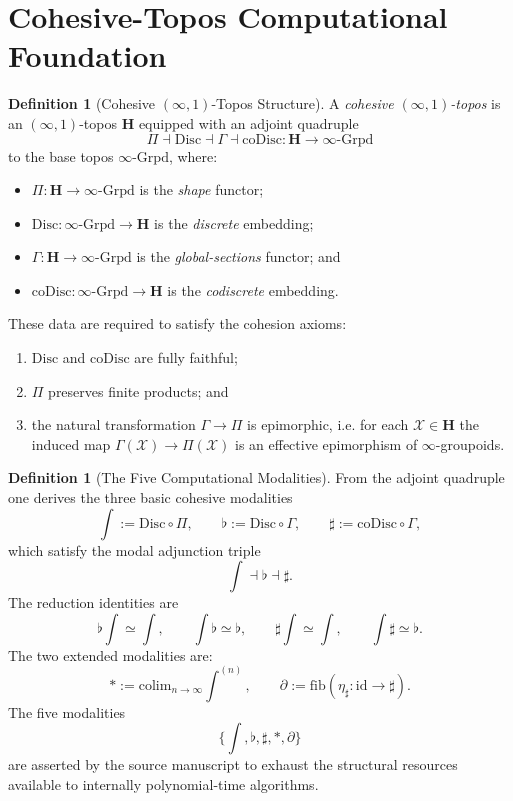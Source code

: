 \documentclass[11pt]{article}
\theoremstyle{definition}
\newtheorem{definition}[theorem]{Definition}
\theoremstyle{remark}
\newcommand{\Hc}{\mathbf{H}}
\begin{document}
\section{Cohesive-Topos Computational Foundation}

\begin{definition}[Cohesive $(\infty,1)$-Topos Structure]\label{def-cohesive-topos-computation}
A \emph{cohesive $(\infty,1)$-topos} is an $(\infty,1)$-topos $\Hc$ equipped with an adjoint quadruple
\[
\Pi \dashv \mathrm{Disc} \dashv \Gamma \dashv \mathrm{coDisc} : \Hc \to \infty\text{-Grpd}
\]
to the base topos $\infty\text{-Grpd}$, where:
\begin{itemize}
\item $\Pi : \Hc \to \infty\text{-Grpd}$ is the \emph{shape} functor;
\item $\mathrm{Disc} : \infty\text{-Grpd} \to \Hc$ is the \emph{discrete} embedding;
\item $\Gamma : \Hc \to \infty\text{-Grpd}$ is the \emph{global-sections} functor; and
\item $\mathrm{coDisc} : \infty\text{-Grpd} \to \Hc$ is the \emph{codiscrete} embedding.
\end{itemize}
These data are required to satisfy the cohesion axioms:
\begin{enumerate}
\item $\mathrm{Disc}$ and $\mathrm{coDisc}$ are fully faithful;
\item $\Pi$ preserves finite products; and
\item the natural transformation $\Gamma \to \Pi$ is epimorphic, i.e. for each $\mathcal X \in \Hc$ the induced map $\Gamma(\mathcal X) \to \Pi(\mathcal X)$ is an effective epimorphism of $\infty$-groupoids.
\end{enumerate}
\end{definition}

\begin{definition}[The Five Computational Modalities]\label{def-five-modalities}
From the adjoint quadruple one derives the three basic cohesive modalities
\[
\int := \mathrm{Disc} \circ \Pi,
\qquad
\flat := \mathrm{Disc} \circ \Gamma,
\qquad
\sharp := \mathrm{coDisc} \circ \Gamma,
\]
which satisfy the modal adjunction triple
\[
\int \dashv \flat \dashv \sharp.
\]
The reduction identities are
\[
\flat\int \simeq \int,
\qquad
\int\flat \simeq \flat,
\qquad
\sharp\int \simeq \int,
\qquad
\int\sharp \simeq \flat.
\]
The two extended modalities are:
\[
\ast := \mathrm{colim}_{n \to \infty} \int^{(n)},
\qquad
\partial := \mathrm{fib}(\eta_\sharp : \mathrm{id} \to \sharp).
\]
The five modalities
\[
\{\int, \flat, \sharp, \ast, \partial\}
\]
are asserted by the source manuscript to exhaust the structural resources available to internally polynomial-time algorithms.
\end{definition}
\end{document}
